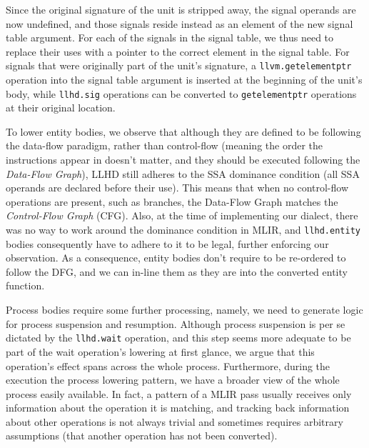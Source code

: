 Since the original signature of the unit is stripped away, the signal operands are now undefined, and those signals reside instead as an element of the new signal table argument. For each of the signals in the signal table, we thus need to replace their uses with a pointer to the correct element in the signal table. For signals that were originally part of the unit's signature, a \texttt{llvm.getelementptr} operation into the signal table argument is inserted at the beginning of the unit's body, while \texttt{llhd.sig} operations can be converted to \texttt{getelementptr} operations at their original location.

To lower entity bodies, we observe that although they are defined to be following the data-flow paradigm, rather than control-flow (meaning the order the instructions appear in doesn't matter, and they should be executed following the \textit{Data-Flow Graph}), LLHD still adheres to the SSA dominance condition (all SSA operands are declared before their use). This means that when no control-flow operations are present, such as branches, the Data-Flow Graph matches the \textit{Control-Flow Graph} (CFG). Also, at the time of implementing our dialect, there was no way to work around the dominance condition in MLIR, and \texttt{llhd.entity} bodies consequently have to adhere to it to be legal, further enforcing our observation. As a consequence, entity bodies don't require to be re-ordered to follow the DFG, and we can in-line them as they are into the converted entity function.

Process bodies require some further processing, namely, we need to generate logic for process suspension and resumption. Although process suspension is per se dictated by the \texttt{llhd.wait} operation, and this step seems more adequate to be part of the wait operation's lowering at first glance, we argue that this operation's effect spans across the whole process. Furthermore, during the execution the process lowering pattern, we have a broader view of the whole process easily available. In fact, a pattern of a MLIR pass usually receives only information about the operation it is matching, and tracking back information about other operations is not always trivial and sometimes requires arbitrary assumptions (\eg that another operation has not been converted).

